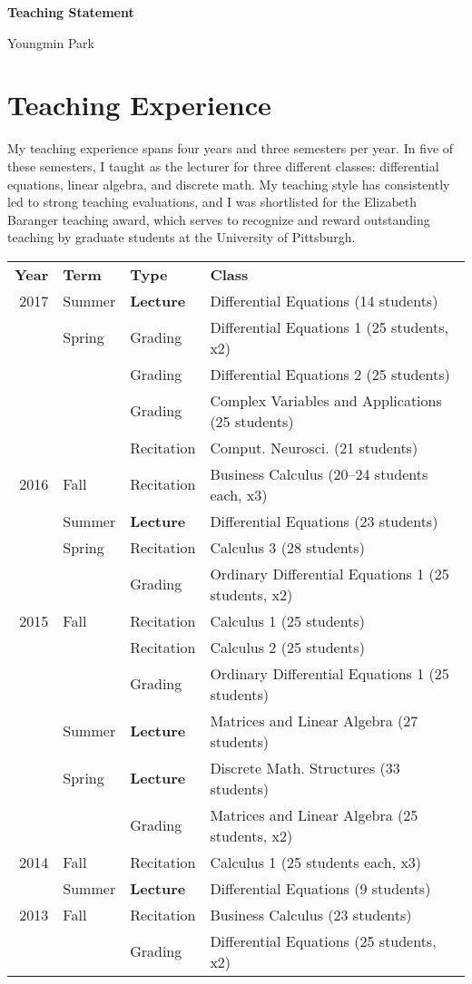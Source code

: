 \documentclass[a4paper,11pt]{article}
\begin{document}
\begin{center}
\Large \textbf{Teaching Statement}

\Large Youngmin Park
\end{center}

\section{Teaching Experience}

My teaching experience spans four years and three semesters per year. In five of these semesters, I taught as the lecturer for three different classes: differential equations, linear algebra, and discrete math. My teaching style has consistently led to strong teaching evaluations, and I was shortlisted for the Elizabeth Baranger teaching award, which serves to recognize and reward outstanding teaching by graduate students at the University of Pittsburgh.

\begin{longtable}{rlll}
\textbf{Year} & \textbf{Term} & \textbf{Type} & \textbf{Class}\\
2017 & Summer& \textbf{Lecture} &  Differential Equations (14 students)\\
     & Spring & Grading &  Differential Equations 1 (25 students, x2)\\
     & & Grading & Differential Equations 2 (25 students)\\
     & & Grading & Complex Variables and Applications (25 students)\\
     & & Recitation & Comput. Neurosci. (21 students)\\
2016 & Fall & Recitation & Business Calculus (20--24 students each, x3)\\
     & Summer & \textbf{Lecture} & Differential Equations (23 students)\\
     & Spring & Recitation & Calculus 3 (28 students)\\
     & & Grading & Ordinary Differential Equations 1 (25 students, x2)\\
2015 & Fall & Recitation & Calculus 1 (25 students)\\
 &  & Recitation & Calculus 2 (25 students)\\
 &  & Grading & Ordinary Differential Equations 1 (25 students)\\
 & Summer & \textbf{Lecture} & Matrices and Linear Algebra (27 students)\\
 & Spring & \textbf{Lecture} & Discrete Math. Structures (33 students)\\
 & & Grading & Matrices and Linear Algebra (25 students, x2)\\
2014 & Fall & Recitation & Calculus 1 (25 students each, x3)\\
 & Summer & \textbf{Lecture} & Differential Equations (9 students)\\
2013 & Fall & Recitation &  Business Calculus (23 students)\\
 & & Grading & Differential Equations (25 students, x2)\\
\end{longtable}
\end{document}
